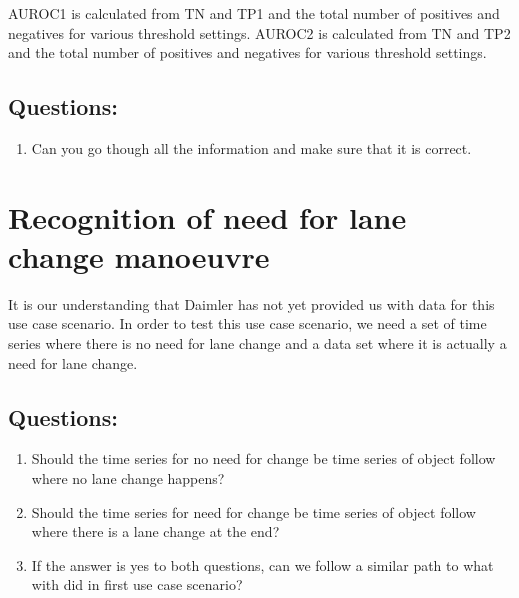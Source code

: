 \documentclass{article}
\theoremstyle{theorem}
\theoremstyle{definition}
\begin{document}
AUROC1 is calculated from TN and TP1 and the total number of positives and negatives for various threshold settings.  AUROC2 is calculated from TN and TP2 and the total number of positives and negatives for various threshold settings.  

\subsection*{Questions: }
\begin{enumerate}
\item Can you go though all the information and make sure that it is correct.
\end{enumerate}


\section{Recognition of need for lane change manoeuvre}

It is our understanding that Daimler has not yet provided us with data for this use case scenario.  In order to test this use case scenario, we need a set of time series where there is no need for lane change and a data set where it is actually a need for lane change. 

\subsection*{Questions: }
\begin{enumerate}
\item Should the time series for no need for change be time series of object follow where no lane change happens?
\item Should the time series for need for change be time series of object follow where there is a lane change at the end?
\item If the answer is yes to both questions, can we follow a similar path to what with did in first use case scenario?
\end{enumerate}



\end{document}
